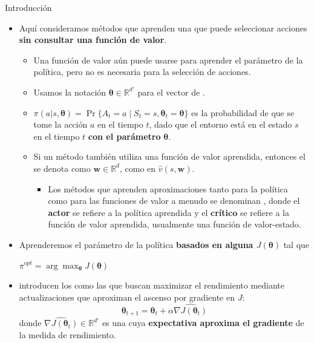 \documentclass[10pt, envcountsect, handout, aspectratio=1610, hyperref={hypertexnames=true}]{beamer}
\begin{document}
\begin{frame}{Introducción}
	\begin{itemize}
		\item Aquí consideramos métodos que aprenden una  que puede seleccionar acciones \textbf{sin consultar una función de valor}.
		\begin{itemize}
			\item Una función de valor aún puede usarse para aprender el parámetro de la política, pero no es necesaria para la selección de acciones.
		
			\item Usamos la notación $\bm{\theta} \in \mathbb{R}^{d'}$ para el vector de .
			
			\item $\pi(a|s, \bm{\theta}) = \Pr\{A_t = a \mid S_t = s, \bm{\theta}_t = \bm{\theta}\}$ es la probabilidad de que se tome la acción $a$ en el tiempo $t$, dado que el entorno está en el estado $s$ en el tiempo $t$ \textbf{con el parámetro} $\bm{\theta}$.
			
			\item Si un método también utiliza una función de valor aprendida, entonces el  se denota como $\mathbf{w} \in \mathbb{R}^d$, como en $\hat{v}(s, \mathbf{w})$.
			
			\begin{itemize}
				\item Los métodos que aprenden aproximaciones tanto para la política como para las funciones de valor a menudo se denominan , donde el \textbf{actor} se refiere a la política aprendida y el \textbf{crítico} se refiere a la función de valor aprendida, usualmente una función de valor-estado.
			\end{itemize}
		\end{itemize}

		\item Aprenderemos el parámetro de la política \textbf{basados en alguna  $J(\bm{\theta})$} tal que
		
		\centerline{$\pi^{opt}= \arg \max_{\bm{\theta}} J(\bm{\theta})$}
		
		\item \cite{sutton1999policy} introducen los  como las que buscan maximizar el rendimiento mediante actualizaciones que aproximan el ascenso por gradiente en $J$:
		\[
		\bm{\theta}_{t+1} = \bm{\theta}_t + \alpha \widehat{\nabla J(\bm{\theta}_t)}
		\]
		donde $\widehat{\nabla J(\bm{\theta}_t)} \in \mathbb{R}^{d'}$ es una  cuya \textbf{expectativa aproxima el gradiente} de la medida de rendimiento.
		
	\end{itemize}
	
\end{frame}
\end{document}
